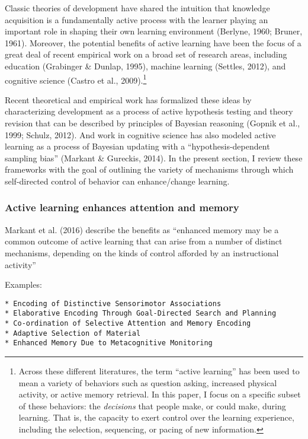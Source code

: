 \documentclass[a4paper,man,apacite,floatsintext]{apa6}
\begin{document}
Classic theories of development have shared the intuition that knowledge
acquisition is a fundamentally active process with the learner playing
an important role in shaping their own learning environment (Berlyne,
1960; Bruner, 1961). Moreover, the potential benefits of active learning
have been the focus of a great deal of recent empirical work on a broad
set of research areas, including education (Grabinger \& Dunlap, 1995),
machine learning (Settles, 2012), and cognitive science (Castro et al.,
2009).\footnote{Across these different literatures, the term ``active
  learning'' has been used to mean a variety of behaviors such as
  question asking, increased physical activity, or active memory
  retrieval. In this paper, I focus on a specific subset of these
  behaviors: the \emph{decisions} that people make, or could make,
  during learning. That is, the capacity to exert control over the
  learning experience, including the selection, sequencing, or pacing of
  new information.}

Recent theoretical and empirical work has formalized these ideas by
characterizing development as a process of active hypothesis testing and
theory revision that can be described by principles of Bayesian
reasoning (Gopnik et al., 1999; Schulz, 2012). And work in cognitive
science has also modeled active learning as a process of Bayesian
updating with a ``hypothesis-dependent sampling bias'' (Markant \&
Gureckis, 2014). In the present section, I review these frameworks with
the goal of outlining the variety of mechanisms through which
self-directed control of behavior can enhance/change learning.

\subsubsection{Active learning enhances attention and
memory}\label{active-learning-enhances-attention-and-memory}

Markant et al. (2016) describe the benefits as ``enhanced memory may be
a common outcome of active learning that can arise from a number of
distinct mechanisms, depending on the kinds of control afforded by an
instructional activity''

Examples:

\begin{verbatim}
* Encoding of Distinctive Sensorimotor Associations
* Elaborative Encoding Through Goal-Directed Search and Planning
* Co-ordination of Selective Attention and Memory Encoding
* Adaptive Selection of Material
* Enhanced Memory Due to Metacognitive Monitoring 
\end{verbatim}
\end{document}
